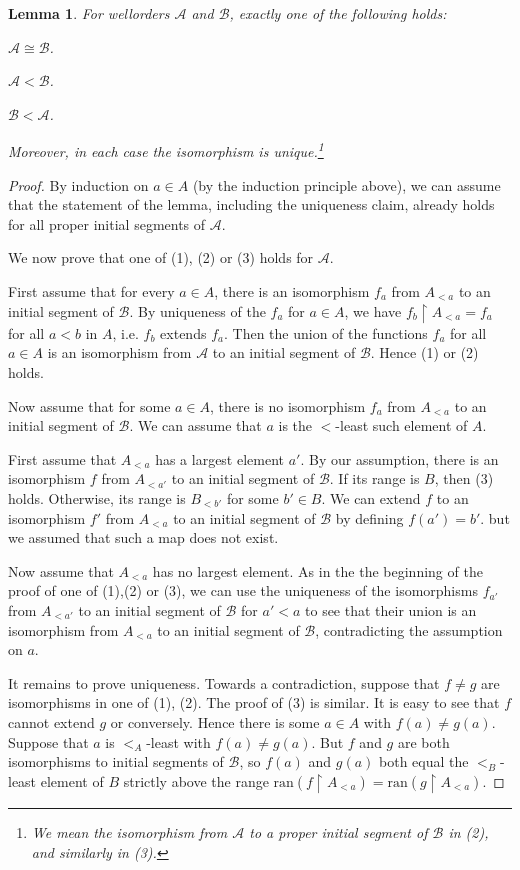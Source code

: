 \documentclass[a4paper, 11pt]{amsart}
\newtheorem{lemma}[lemma]{Lemma}
\theoremstyle{remark}
\newcommand{\cB}{\mathcal B}
\newcommand{\cA}{\mathcal A}
\newcommand{\ran}{\mathrm{ran}}
\newenvironment{enumerate-(1)}{\begin{enumerate}[label={\upshape (\arabic*)}, leftmargin=2pc]}{\end{enumerate}}
\begin{document}
\begin{lemma} 
For wellorders $\cA$ and $\cB$, exactly one of the following holds: 
\begin{enumerate-(1)} 
\item 
$\cA \cong \cB$. 
\item 
$\cA < \cB$. 
\item 
$\cB < \cA$. 
\end{enumerate-(1)} 
Moreover, in each case the isomorphism is unique.\footnote{We mean the isomorphism from $\cA$ to  a proper initial segment of $\cB$ in (2), and similarly in (3).} 
\end{lemma} 
\begin{proof} 
By induction on $a\in A$ (by the induction principle above), we can assume that the statement of the lemma, including the uniqueness claim, already holds for all proper initial segments of $\cA$. 

We now prove that one of (1), (2) or (3) holds for $\cA$. 

First assume that for every $a\in A$, there is an isomorphism $f_a$ from $ A_{<a}$ to an initial segment of $\cB$. 
By uniqueness of the $f_a$ for $a\in A$, we have $f_b{\upharpoonright}A_{<a}=f_a$ for all $a<b$ in $A$, i.e. $f_b$ extends $f_a$. 
Then the union of the functions $f_a$ for all $a\in A$ is an isomorphism from $\cA$ to an initial segment of $\cB$. 
Hence (1) or (2) holds. 

Now assume that for some $a\in A$, there is no isomorphism $f_a$ from $A_{<a}$ to an initial segment of $\cB$. 
We can assume that $a$ is the $<$-least such element of $A$. 

First assume that $A_{<a}$ has a largest element $a'$. 
By our assumption, there is an isomorphism $f$ from $A_{<a'}$ to an initial segment of $\cB$. 
If its range is $B$, then (3) holds. 
Otherwise, its range is $B_{<b'}$ for some $b'\in B$. 
We can extend $f$ to an isomorphism $f'$ from $A_{<a}$ to an initial segment of $\cB$ by defining $f(a')=b'$. 
but we assumed that such a map does not exist.  

Now assume that $A_{<a}$ has no largest element. 
As in the the beginning of the proof of one of (1),(2) or (3), we can use the uniqueness of the isomorphisms $f_{a'}$ from $A_{<a'}$ to an initial segment of $\cB$ for $a'<a$ to see that their union is an isomorphism from $A_{<a}$ to an initial segment of $\cB$, contradicting the assumption on $a$. 

It remains to prove uniqueness. 
Towards a contradiction, suppose that $f\neq g$ are isomorphisms in one of (1), (2). 
The proof of (3) is similar. 
It is easy to see that $f$ cannot extend $g$ or conversely. 
Hence there is some $a\in A$ with $f(a)\neq g(a)$. 
Suppose that $a$ is $<_A$-least with $f(a)\neq g(a)$. 
But $f$ and $g$ are both isomorphisms to initial segments of $\cB$, so $f(a)$ and $g(a)$ both equal the $<_B$-least element of $B$ strictly above the range $\ran(f{\upharpoonright}A_{<a})=\ran(g{\upharpoonright}A_{<a})$. 
\end{proof} 
\end{document}

